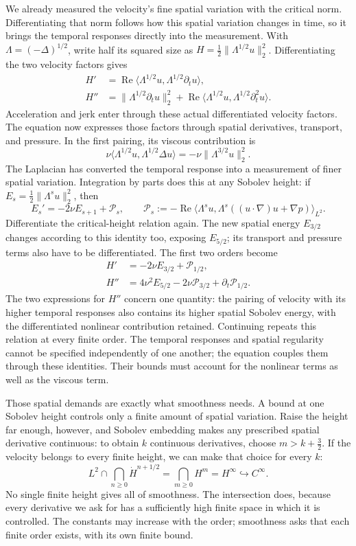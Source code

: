 We already measured the velocity's fine spatial variation with the critical
norm. Differentiating that norm follows how this spatial variation changes
in time, so it brings the temporal responses directly into the measurement.
With \(\Lambda=(-\Delta)^{1/2}\), write half its squared size as
\(H=\tfrac12\|\Lambda^{1/2}u\|_2^2\). Differentiating the two velocity
factors gives
\[
 \begin{aligned}
 H'&=\operatorname{Re}\langle\Lambda^{1/2}u,
                          \Lambda^{1/2}\partial_tu\rangle,\\
 H''&=\|\Lambda^{1/2}\partial_tu\|_2^2
 +\operatorname{Re}\langle\Lambda^{1/2}u,
                          \Lambda^{1/2}\partial_t^2u\rangle.
 \end{aligned}
\]
Acceleration and jerk enter through these actual differentiated velocity
factors. The equation now expresses those factors through spatial
derivatives, transport, and pressure. In the first pairing, its viscous
contribution is
\[
 \nu\langle\Lambda^{1/2}u,\Lambda^{1/2}\Delta u\rangle
 =-\nu\|\Lambda^{3/2}u\|_2^2.
\]
The Laplacian has converted the temporal response into a measurement of
finer spatial variation. Integration by parts does this at any Sobolev
height: if \(E_s=\tfrac12\|\Lambda^su\|_2^2\), then
\[
 E_s'=-2\nu E_{s+1}+\mathcal P_s,
 \qquad
 \mathcal P_s:=-\operatorname{Re}\langle\Lambda^su,
 \Lambda^s((u\cdot\nabla)u+\nabla p)\rangle_{L^2}.
\]
Differentiate the critical-height relation again. The new spatial energy
\(E_{3/2}\) changes according to this identity too, exposing
\(E_{5/2}\); its transport and pressure terms also have to be differentiated.
The first two orders become
\[
 \begin{aligned}
 H'&=-2\nu E_{3/2}+\mathcal P_{1/2},\\
 H''&=4\nu^2E_{5/2}-2\nu\mathcal P_{3/2}
       +\partial_t\mathcal P_{1/2}.
 \end{aligned}
\]
The two expressions for \(H''\) concern one quantity: the pairing of velocity
with its higher temporal responses also contains its higher spatial
Sobolev energy, with the differentiated nonlinear contribution retained.
Continuing repeats this relation at every finite order. The temporal
responses and spatial regularity cannot be specified independently of one
another; the equation couples them through these identities. Their bounds
must account for the nonlinear terms as well as the viscous term.

Those spatial demands are exactly what smoothness needs. A bound at one
Sobolev height controls only a finite amount of spatial variation. Raise
the height far enough, however, and Sobolev embedding makes any prescribed
spatial derivative continuous: to obtain \(k\) continuous derivatives,
choose \(m>k+\tfrac32\). If the velocity belongs to every finite height,
we can make that choice for every \(k\):
\[
 L^2\cap\bigcap_{n\ge0}\dot H^{n+1/2}
 =\bigcap_{m\ge0}H^m
 =H^\infty
 \hookrightarrow C^\infty.
\]
No single finite height gives all of smoothness. The intersection does,
because every derivative we ask for has a sufficiently high finite space
in which it is controlled. The constants may increase with the order;
smoothness asks that each finite order exists, with its own finite bound.

